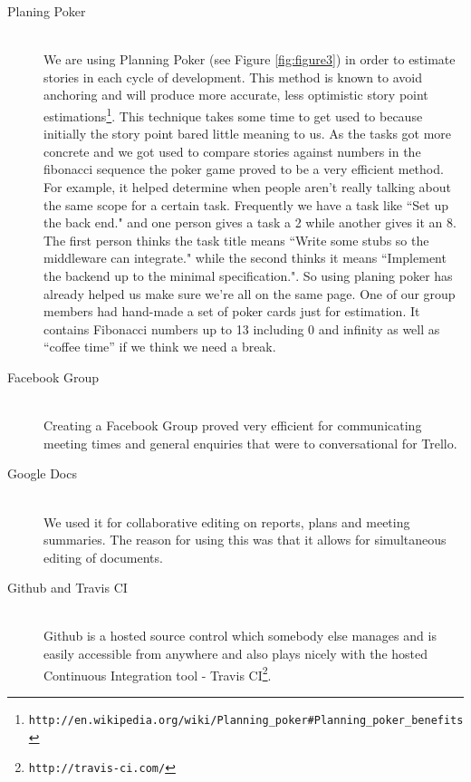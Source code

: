 \documentclass[11pt, a4paper]{article}
\begin{document}
\begin{description}
  \item[Planing Poker] \hfill \\
We are using Planning Poker (see Figure \ref{fig:figure3}) in order to estimate stories in each cycle of development. This method is known to avoid anchoring and will produce more accurate, less optimistic story point estimations\footnote{\tt{http://en.wikipedia.org/wiki/Planning\_poker\#Planning\_poker\_benefits}}. This technique takes some time to get used to because initially the story point bared little meaning to us. As the tasks got more concrete and we got used to compare stories against numbers in the fibonacci sequence the poker game proved to be a very efficient method. 
For example, it helped determine when people aren't really talking about the same scope for a certain task. Frequently we have a task like ``Set up the back end." and one person gives a task a 2 while another gives it an 8. The first person thinks the task title means ``Write some stubs so the middleware can integrate." while the second thinks it means ``Implement the backend up to the minimal specification.". So using planing poker has already helped us make sure we're all on the same page. One of our group members had hand-made a set of poker cards just for estimation. It contains Fibonacci numbers up to 13 including 0 and infinity as well as ``coffee time'' if we think we need a break. 

  \item[Facebook Group] \hfill \\
  Creating a Facebook Group proved very efficient for communicating meeting times and general enquiries that were to conversational for Trello.  

  \item[Google Docs] \hfill \\
  We used it for collaborative editing on reports, plans and meeting summaries. The reason for using this was that it allows for simultaneous editing of documents.
  \item[Github and Travis CI] \hfill \\
  Github is a hosted source control which somebody else manages and is easily accessible from anywhere and also plays nicely with the hosted Continuous Integration tool - Travis CI\footnote{\tt{http://travis-ci.com/}}.



\end{description}
\end{document}
